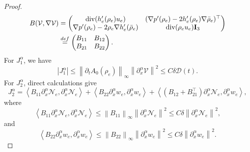 \documentclass[reqno,twoside,12pt,a4paper]{amsart}
\newcommand{\al}{\alpha}
\newcommand{\dive}{\mathrm{div}}
\newcommand{\pt}{\partial_t}
\newcommand{\pa}{\partial}
\numberwithin{equation}{section}
\begin{document}
\begin{proof}
\begin{equation*}
\begin{aligned}
    B(\mathcal{V},\nabla\mathcal{V})&=\begin{pmatrix}
    \dive(h'_e(\rho_e)u_e) & (\nabla p'(\rho_e)-2h'_e(\rho_e)\nabla\bar{\rho}_e)^\top\\
    \nabla p'(\rho_e)-2\rho_e \nabla h'_e(\bar{\rho}_e) & \dive(\rho_e u_e){\bf{I}}_3
    \end{pmatrix}\\
    &\overset{def}{=} \begin{pmatrix}
    B_{11} & B_{12} \\
    B_{21}& B_{22}
    \end{pmatrix}.
\end{aligned}
\end{equation*}
For $J_1^\alpha$, we have
\begin{equation}\label{19}
| J_1^\alpha| \leq \left\|\pt A_0(\rho_e) \right\|_\infty \left\|\pa_x^\al \mathcal{V} \right\|^2 \leq C\delta \mathcal{D}(t).
\end{equation}
For $J_2^\alpha$, direct calculations give
\begin{equation*}
    J_2^\alpha=\left< B_{11} \pa_x^\al\mathcal{N}_e ,\pa_x^\al \mathcal{N}_e \right>+\left< B_{22} \pa_x^\al w_e ,\pa_x^\al w_e \right>+\left< (B_{12}+B_{21}^\top) \pa_x^\al\mathcal{N}_e ,\pa_x^\al w_e \right>,
\end{equation*}
where
\begin{equation}\label{21}
    \left< B_{11} \pa_x^\al\mathcal{N}_e ,\pa_x^\al \mathcal{N}_e \right> \leq 
    \left\| B_{11} \right\|_\infty \left\| \pa_x^\al \mathcal{N}_e \right\|^2 \leq C\delta \left\| \pa_x^\al \mathcal{N}_e \right\|^2,
\end{equation}
and
\begin{equation}\label{22}
    \left< B_{22} \pa_x^\al w_e ,\pa_x^\al w_e \right> \leq 
    \left\| B_{22} \right\|_\infty \left\| \pa_x^\al w_e \right\|^2 \leq C\delta \left\| \pa_x^\al w_e \right\|^2.
\end{equation}


\end{proof}
\end{document}
